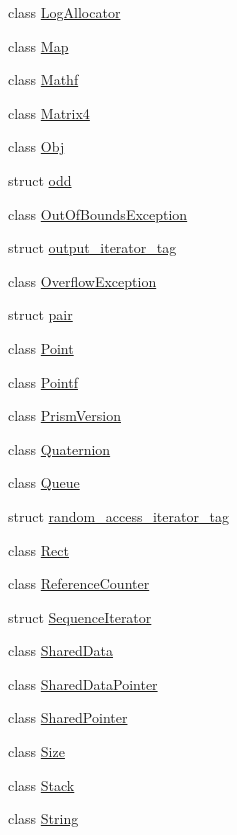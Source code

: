 \begin{DoxyCompactItemize}
class \hyperlink{classprism_1_1_log_allocator}{Log\+Allocator}
\item 
class \hyperlink{classprism_1_1_map}{Map}
\item 
class \hyperlink{classprism_1_1_mathf}{Mathf}
\item 
class \hyperlink{classprism_1_1_matrix4}{Matrix4}
\item 
class \hyperlink{classprism_1_1_obj}{Obj}
\item 
struct \hyperlink{structprism_1_1odd}{odd}
\item 
class \hyperlink{classprism_1_1_out_of_bounds_exception}{Out\+Of\+Bounds\+Exception}
\item 
struct \hyperlink{structprism_1_1output__iterator__tag}{output\+\_\+iterator\+\_\+tag}
\item 
class \hyperlink{classprism_1_1_overflow_exception}{Overflow\+Exception}
\item 
struct \hyperlink{structprism_1_1pair}{pair}
\item 
class \hyperlink{classprism_1_1_point}{Point}
\item 
class \hyperlink{classprism_1_1_pointf}{Pointf}
\item 
class \hyperlink{classprism_1_1_prism_version}{Prism\+Version}
\item 
class \hyperlink{classprism_1_1_quaternion}{Quaternion}
\item 
class \hyperlink{classprism_1_1_queue}{Queue}
\item 
struct \hyperlink{structprism_1_1random__access__iterator__tag}{random\+\_\+access\+\_\+iterator\+\_\+tag}
\item 
class \hyperlink{classprism_1_1_rect}{Rect}
\item 
class \hyperlink{classprism_1_1_reference_counter}{Reference\+Counter}
\item 
struct \hyperlink{structprism_1_1_sequence_iterator}{Sequence\+Iterator}
\item 
class \hyperlink{classprism_1_1_shared_data}{Shared\+Data}
\item 
class \hyperlink{classprism_1_1_shared_data_pointer}{Shared\+Data\+Pointer}
\item 
class \hyperlink{classprism_1_1_shared_pointer}{Shared\+Pointer}
\item 
class \hyperlink{classprism_1_1_size}{Size}
\item 
class \hyperlink{classprism_1_1_stack}{Stack}
\item 
class \hyperlink{classprism_1_1_string}{String}
\item 

\end{DoxyCompactItemize}
